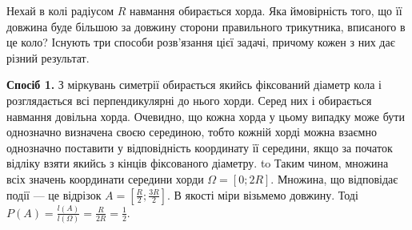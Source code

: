\begin{example}
    Нехай в колі радіусом $R$ навмання обирається хорда. Яка ймовірність того, 
    що її довжина буде більшою за довжину сторони правильного трикутника, 
    вписаного в це коло?
    \newline
    Існують три способи розв'язання цієї задачі, причому кожен з них дає різний результат.
    
    \textbf{Спосіб 1.}
    З міркувань симетрії обирається якийсь фіксований діаметр кола і розглядається
    всі перпендикулярні до нього хорди. Серед них і обирається навмання довільна хорда.
    Очевидно, що кожна хорда у цьому випадку може бути однозначно визначена своєю серединою,
    тобто кожній хорді можна взаємно однозначно поставити у відповідність координату її середини,
    якщо за початок відліку взяти якийсь з кінців фіксованого діаметру.
    \newline
    \hbox to 
    Таким чином, множина всіх значень координати середини хорди $\Omega = \left[0; 2R\right]$. 
    Множина, що відповідає події --- це відрізок $A = \left[\frac{R}{2}; \frac{3R}{2}\right]$.
    В якості міри візьмемо довжину. Тоді $P(A) = \frac{l(A)}{l(\Omega)} = \frac{R}{2R}= \frac{1}{2}$.
    

\end{example}
